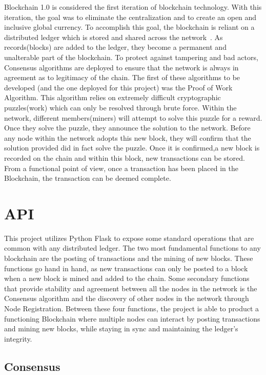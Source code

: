 Blockchain 1.0 is considered the first iteration of blockchain
technology.  With this iteration, the goal was to eliminate the
centralization and to create an open and inclusive global currency. To
accomplish this goal, the blockchain is reliant on a distributed
ledger which is stored and shared across the
network~\cite{hid-sp18-414-www-promise-bitcoin-blockchain}.  As
records(blocks) are added to the ledger, they become a permanent and
unalterable part of the blockchain. To protect against tampering and
bad actors, Consensus algorithms are deployed to ensure that the
network is always in agreement as to legitimacy of the chain. The
first of these algorithms to be developed (and the one deployed for
this project) was the Proof of Work Algorithm. This algorithm relies
on extremely difficult cryptographic puzzles(work) which can only be
resolved through brute force. Within the network, different
members(miners) will attempt to solve this puzzle for a reward. Once
they solve the puzzle, they announce the solution to the
network. Before any node within the network adopts this new block,
they will confirm that the solution provided did in fact solve the
puzzle. Once it is confirmed,a new block is recorded on the chain and
within this block, new transactions can be stored. From a functional
point of view, once a transaction has been placed in the Blockchain,
the transaction can be deemed
complete.~\cite{hid-sp18-414-financialinnovation-zhao}

\section{API}

This project utilizes Python Flask to expose some standard operations
that are common with any distributed ledger. The two most fundamental
functions to any blockchain are the posting of transactions and the
mining of new blocks. These functions go hand in hand, as new
transactions can only be posted to a block when a new block is mined
and added to the chain. Some secondary functions that provide
stability and agreement between all the nodes in the network is the
Consensus algorithm and the discovery of other nodes in the network
through Node Registration. Between these four functions, the project
is able to product a functioning Blockchain where multiple nodes can
interact by posting transactions and mining new blocks, while staying
in sync and maintaining the ledger's integrity.

\subsection{Consensus}

